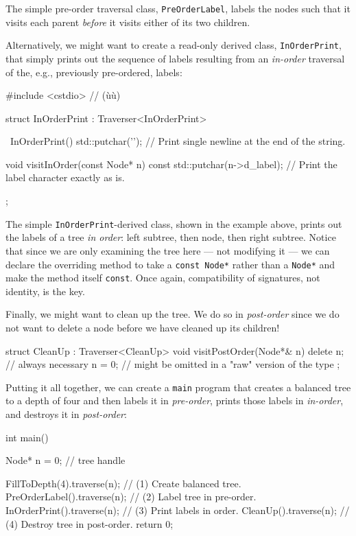 \noindent The simple pre-order traversal class, \lstinline!PreOrderLabel!, labels the
nodes such that it visits each parent \emph{before} it visits either of
its two children.

Alternatively, we might want to create a read-only derived class,
\lstinline!InOrderPrint!, that simply prints out the sequence of labels
resulting from an \emph{in-order} traversal of the, e.g., previously
pre-ordered, labels:

\begin{emcppslisting}[emcppsbatch=e9]
#include <cstdio>  // (ù{}ù)

struct InOrderPrint : Traverser<InOrderPrint>
{
    ~InOrderPrint()
    {
        std::putchar('\n');  // Print single newline at the end of the string.
    }

    void visitInOrder(const Node* n) const
    {
        std::putchar(n->d_label);  // Print the label character exactly as is.
    }
};
\end{emcppslisting}
    
\noindent The simple \lstinline!InOrderPrint!-derived class, shown in the example above, prints out the
labels of a tree \emph{in order}: left subtree, then node, then right
subtree. Notice that since we are only examining the tree here --- not
modifying it --- we can declare the overriding method to take a
\lstinline!const!~\lstinline!Node*! rather than a \lstinline!Node*! and make the
method itself \lstinline!const!. Once again, compatibility of signatures,
not identity, is the key.

Finally, we might want to clean up the tree. We do so in
\emph{post-order} since we do not want to delete a node before we have
cleaned up its children!

\begin{emcppslisting}[emcppsbatch=e9]
struct CleanUp : Traverser<CleanUp>
{
    void visitPostOrder(Node*& n)
    {
        delete n;  // always necessary
        n = 0;     // might be omitted in a "raw" version of the type
    }
};
\end{emcppslisting}
    
\noindent Putting it all together, we can create a \lstinline!main! program that
creates a balanced tree to a depth of four and then labels it in
\emph{pre-order}, prints those labels in \emph{in-order}, and destroys
it in \emph{post-order}:

\begin{emcppslisting}[emcppsbatch=e9]
int main()
{
    Node* n = 0;                  // tree handle

    FillToDepth(4).traverse(n);   // (1) Create balanced tree.
    PreOrderLabel().traverse(n);  // (2) Label tree in pre-order.
    InOrderPrint().traverse(n);   // (3) Print labels in order.
    CleanUp().traverse(n);        // (4) Destroy tree in post-order.
    return 0;
}
\end{emcppslisting}
    
